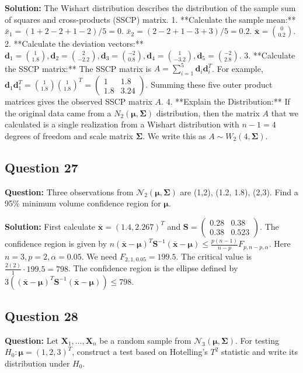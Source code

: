 \textbf{Solution:}
The Wishart distribution describes the distribution of the sample sum of squares and cross-products (SSCP) matrix.
1.  **Calculate the sample mean:**
    $\bar{x}_1 = (1+2-2+1-2)/5 = 0$.
    $\bar{x}_2 = (2-2+1-3+3)/5 = 0.2$.
    $\bar{\mathbf{x}} = \binom{0}{0.2}$.
2.  **Calculate the deviation vectors:**
    $\mathbf{d}_1 = \binom{1}{1.8}, \mathbf{d}_2 = \binom{2}{-2.2}, \mathbf{d}_3 = \binom{-2}{0.8}, \mathbf{d}_4 = \binom{1}{-3.2}, \mathbf{d}_5 = \binom{-2}{2.8}$.
3.  **Calculate the SSCP matrix:**
    The SSCP matrix is $A = \sum_{i=1}^5 \mathbf{d}_i \mathbf{d}_i^T$.
    For example, $\mathbf{d}_1\mathbf{d}_1^T = \binom{1}{1.8}\binom{1}{1.8}^T = \begin{pmatrix} 1 & 1.8 \\ 1.8 & 3.24 \end{pmatrix}$.
    Summing these five outer product matrices gives the observed SSCP matrix $A$.
4.  **Explain the Distribution:**
    If the original data came from a $N_2(\boldsymbol{\mu}, \boldsymbol{\Sigma})$ distribution, then the matrix $A$ that we calculated is a single realization from a Wishart distribution with $n-1=4$ degrees of freedom and scale matrix $\boldsymbol{\Sigma}$. We write this as $A \sim W_2(4, \boldsymbol{\Sigma})$.

\subsection*{Question 27}
\textbf{Question:} Three observations from $\mathcal{N}_2(\boldsymbol{\mu}, \boldsymbol{\Sigma})$ are (1,2), (1.2, 1.8), (2,3). Find a 95\% minimum volume confidence region for $\boldsymbol{\mu}$.

\textbf{Solution:}
First calculate $\bar{\mathbf{x}} = (1.4, 2.267)^T$ and $\mathbf{S} = \begin{pmatrix} 0.28 & 0.38 \\ 0.38 & 0.523 \end{pmatrix}$.
The confidence region is given by $n(\bar{\mathbf{x}}-\boldsymbol{\mu})^T \mathbf{S}^{-1} (\bar{\mathbf{x}}-\boldsymbol{\mu}) \le \frac{p(n-1)}{n-p}F_{p,n-p,\alpha}$.
Here $n=3, p=2, \alpha=0.05$. We need $F_{2,1,0.05} = 199.5$.
The critical value is $\frac{2(2)}{1} \cdot 199.5 = 798$.
The confidence region is the ellipse defined by $3((\bar{\mathbf{x}}-\boldsymbol{\mu})^T \mathbf{S}^{-1} (\bar{\mathbf{x}}-\boldsymbol{\mu})) \le 798$.

\subsection*{Question 28}
\textbf{Question:} Let $\mathbf{X}_1, \dots, \mathbf{X}_n$ be a random sample from $\mathcal{N}_3(\boldsymbol{\mu}, \boldsymbol{\Sigma})$. For testing $H_0: \boldsymbol{\mu} = (1, 2, 3)^T$, construct a test based on Hotelling's $T^2$ statistic and write its distribution under $H_0$.

